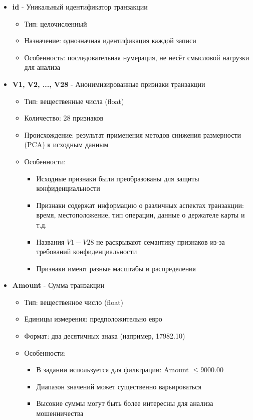 \documentclass[areaset=advanced]{scrartcl}
\begin{document}
\begin{itemize}
    \item \textbf{id} - Уникальный идентификатор транзакции
    \begin{itemize}
        \item Тип: целочисленный
        \item Назначение: однозначная идентификация каждой записи
        \item Особенность: последовательная нумерация, не несёт смысловой нагрузки для анализа
    \end{itemize}
    
    \item \textbf{V1, V2, ..., V28} - Анонимизированные признаки транзакции
    \begin{itemize}
        \item Тип: вещественные числа (float)
        \item Количество: 28 признаков
        \item Происхождение: результат применения методов снижения размерности (PCA) к исходным данным
        \item Особенности:
        \begin{itemize}
            \item Исходные признаки были преобразованы для защиты конфиденциальности
            \item Признаки содержат информацию о различных аспектах транзакции: время, местоположение, тип операции, данные о держателе карты и т.д.
            \item Названия $V1-V28$ не раскрывают семантику признаков из-за требований конфиденциальности
            \item Признаки имеют разные масштабы и распределения
        \end{itemize}
    \end{itemize}
    
    \item \textbf{Amount} - Сумма транзакции
    \begin{itemize}
        \item Тип: вещественное число (float)
        \item Единицы измерения: предположительно евро
        \item Формат: два десятичных знака (например, 17982.10)
        \item Особенности:
        \begin{itemize}
            \item В задании используется для фильтрации: Amount $ \leq 9000.00$
            \item Диапазон значений может существенно варьироваться
            \item Высокие суммы могут быть более интересны для анализа мошенничества
        \end{itemize}
    \end{itemize}
    

\end{itemize}
\end{document}
